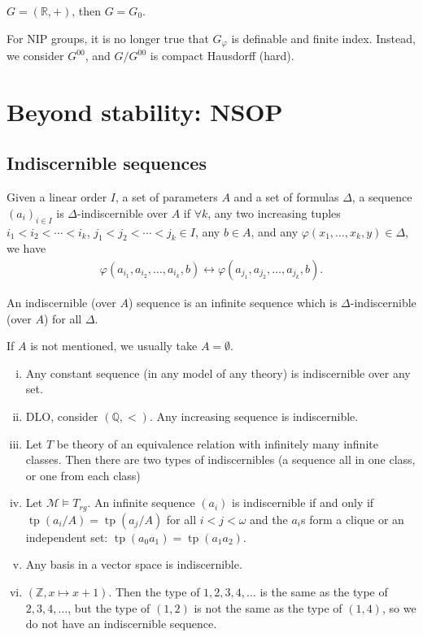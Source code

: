 \documentclass{article}
\let\models\vDash
\DeclareMathOperator{\tp}{tp}
\begin{document}
$G = (\mathbb{R},+)$, then $G = G_0$.

For NIP groups, it is no longer true that $G_\varphi$ is definable and finite index.
Instead, we consider $G^{00}$, and $G/G^{00}$ is compact Hausdorff (hard).

\clearpage
\section{Beyond stability: NSOP}
\subsection{Indiscernible sequences}
\begin{defi}
  \newlec
  Given a linear order $I$, a set of parameters $A$ and a set of formulas $\Delta$, a sequence $(a_i)_{i \in I}$ is $\Delta$-indiscernible over $A$ if $\forall k$, any two increasing tuples $i_1 < i_2 < \dotsb < i_k$, $j_1 < j_2 < \dotsb < j_k \in I$, any $b \in A$, and any $\varphi(x_1, \dotsc, x_k, y) \in \Delta$, we have
  \begin{align*}
    \varphi(a_{i_1}, a_{i_2}, \dotsc, a_{i_k}, b) \leftrightarrow \varphi(a_{j_1}, a_{j_2}, \dotsc, a_{j_k}, b).
  \end{align*}

  An indiscernible (over $A$) sequence is an infinite sequence which is $\Delta$-indiscernible (over $A$) for all $\Delta$.

  If $A$ is not mentioned, we usually take $A = \emptyset$.
\end{defi}
\begin{eg}
  \begin{enumerate}[(i)]
    \item Any constant sequence (in any model of any theory) is indiscernible over any set.
    \item DLO, consider $(\mathbb{Q},<)$. Any increasing sequence is indiscernible.
    \item Let $T$ be theory of an equivalence relation with infinitely many infinite classes.
      Then there are two types of indiscernibles (a sequence all in one class, or one from each class)
    \item Let $\mathcal{M} \models T_{rg}$. An infinite sequence $(a_i)$ is indiscernible if and only if $\tp(a_i/A) = \tp(a_j/A)$ for all $i < j < \omega$ and the $a_i$s form a clique or an independent set: $\tp(a_0 a_1) = \tp(a_1 a_2)$.
    \item Any basis in a vector space is indiscernible.
    \item $(\mathbb{Z},x \mapsto x+1)$. Then the type of $1,2,3,4,\dotsc$ is the same as the type of $2,3,4,\dotsc$, but the type of $(1,2)$ is not the same as the type of $(1,4)$, so we do not have an indiscernible sequence.
  \end{enumerate}
\end{eg}
\end{document}
